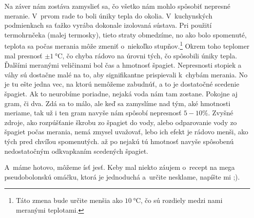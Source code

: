 

Na záver nám zostáva zamyslieť sa, čo všetko nám mohlo spôsobiť nepresné meranie.
V~prvom rade to boli úniky tepla do okolia. V~kuchynských podmienkach sa ťažko vyrába dokonale izolovaná sústava. 
Pri použití termohrnčeka (malej termosky), tieto straty obmedzíme, no ako bolo spomenuté, teplota sa počas merania môže zmeniť
o~niekoľko stupňov.\footnote{Táto zmena bude určite menšia ako $\SI{10}{\celsius}$, čo sú rozdiely medzi nami 
meranými teplotami.} Okrem toho teplomer mal presnosť $\pm \SI{1}{\celsius}$, čo chyba rádovo na úrovni tých, čo spôsobili 
úniky tepla. 
Ďalšími meranými veličinami bol čas a hmotnosť špagiet. Nepresnosti stopiek a váhy sú dostačne malé na to, 
aby signifikantne prispievali k~chybám merania. No je tu ešte jedna vec, na ktorú nemôžeme zabudnúť, 
a to je dostatočné scedenie špagiet. Ak to neurobíme poriadne, nejaká voda nám tam zostane. Pokojne aj gram, či dva. 
Zdá sa to málo, ale keď sa zamyslíme nad tým, aké hmotnosti meriame, tak už i ten gram navyše nám spôsobí nepresnosť 
$5 - 10 \%$. Zvyšné zdroje, ako rozpúšťanie škrobu zo špagiet do vody, alebo odparovanie vody zo špagiet počas merania,
nemá zmysel uvažovať, lebo ich efekt je rádovo menši, ako tých pred chvíľou spomenutých.
až po nejakú tú hmotnosť navyše spôsobenú nedostatočným odkvapkaním scedených špagiet.

A~máme hotovo, môžeme ísť jesť. Keby mal niekto záujem o~recept na mega pseudobolonskú omáčku, ktorá je jednoduchá a~určite nesklame, napíšte mi ;).
